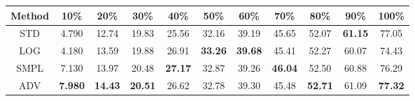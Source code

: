 \documentclass{standalone}
\begin{document}
\begin{tabular}{c|cccccccccc}
      \toprule
      Method & 10\% & 20\% & 30\% & 40\% & 50\% & 60\% & 70\% & 80\% & 90\% & 100\% \\
      \midrule
STD & 4.790 & 12.74 & 19.83 & 25.56 & 32.16 & 39.19 & 45.65 & 52.07 & \textbf{61.15} & 77.05\\
LOG & 4.180 & 13.59 & 19.88 & 26.91 & \textbf{33.26} & \textbf{39.68} & 45.41 & 52.27 & 60.07 & 74.43\\
SMPL & 7.130 & 13.97 & 20.48 & \textbf{27.17} & 32.87 & 39.26 & \textbf{46.04} & 52.50 & 60.88 & 76.29\\
ADV & \textbf{7.980} & \textbf{14.43} & \textbf{20.51} & 26.62 & 32.78 & 39.30 & 45.48 & \textbf{52.71} & 61.09 & \textbf{77.32}\\
  \bottomrule
\end{tabular}
\end{document}
